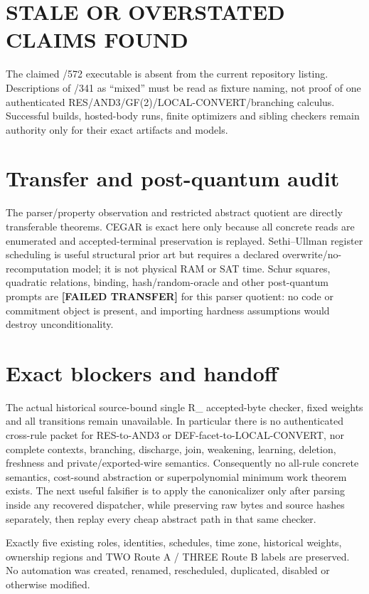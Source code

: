 \documentclass[11pt]{article}
\newcommand{\status}[1]{\textbf{[#1]}}
\newcommand{\Rmix}{R_{\mathrm{mix341}}}
\begin{document}
\section{STALE OR OVERSTATED CLAIMS FOUND}

The claimed /572 executable is absent from the current repository listing.
Descriptions of /341 as ``mixed'' must be read as fixture naming, not proof of
one authenticated RES/AND3/GF(2)/LOCAL-CONVERT/branching calculus.  Successful
builds, hosted-body runs, finite optimizers and sibling checkers remain authority
only for their exact artifacts and models.

\section{Transfer and post-quantum audit}

The parser/property observation and restricted abstract quotient are directly
transferable theorems.  CEGAR is exact here only because all concrete reads are
enumerated and accepted-terminal preservation is replayed.  Sethi--Ullman
register scheduling is useful structural prior art but requires a declared
overwrite/no-recomputation model; it is not physical RAM or SAT time.
Schur squares, quadratic relations, binding, hash/random-oracle and other
post-quantum prompts are \status{FAILED TRANSFER} for this parser quotient: no
code or commitment object is present, and importing hardness assumptions would
destroy unconditionality.

\section{Exact blockers and handoff}

The actual historical source-bound single \Rmix{} accepted-byte checker, fixed
weights and all transitions remain unavailable.  In particular there is no
authenticated cross-rule packet for RES-to-AND3 or DEF-facet-to-LOCAL-CONVERT,
nor complete contexts, branching, discharge, join, weakening, learning,
deletion, freshness and private/exported-wire semantics.  Consequently no
all-rule concrete semantics, cost-sound abstraction or superpolynomial minimum
work theorem exists.  The next useful falsifier is to apply the canonicalizer
only after parsing inside any recovered dispatcher, while preserving raw bytes
and source hashes separately, then replay every cheap abstract path in that
same checker.

Exactly five existing roles, identities, schedules, time zone, historical
weights, ownership regions and TWO Route A / THREE Route B labels are preserved.
No automation was created, renamed, rescheduled, duplicated, disabled or
otherwise modified.
\end{document}
